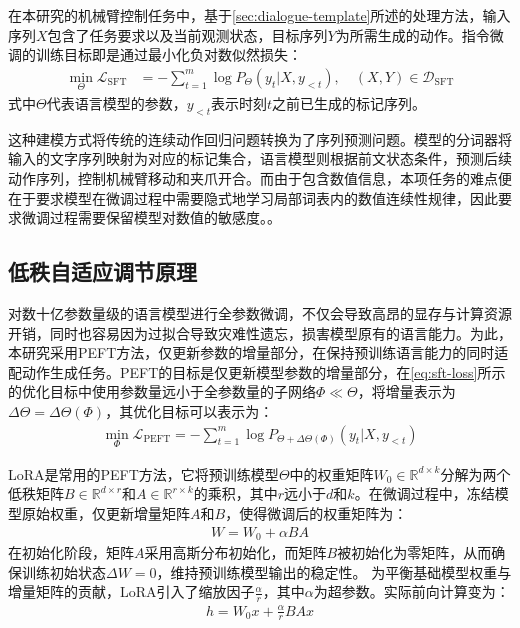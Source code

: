 在本研究的机械臂控制任务中，基于\cref{sec:dialogue-template}所述的处理方法，输入序列$X$包含了任务要求以及当前观测状态，目标序列$Y$为所需生成的动作。指令微调的训练目标即是通过最小化负对数似然损失：
\begin{align}\label{eq:sft-loss}
  \min_{\Theta}\mathcal{L}_{\text{SFT}} &= -\sum_{t=1}^{m} \log P_{\Theta}(y_t | X, y_{<t}), \quad (X,Y) \in \mathcal{D}_{\text{SFT}}
\end{align}
式中$\Theta$代表语言模型的参数，$y_{<t}$表示时刻$t$之前已生成的标记序列。

这种建模方式将传统的连续动作回归问题转换为了序列预测问题。模型的分词器将输入的文字序列映射为对应的标记集合，语言模型则根据前文状态条件，预测后续动作序列，控制机械臂移动和夹爪开合。而由于包含数值信息，本项任务的难点便在于要求模型在微调过程中需要隐式地学习局部词表内的数值连续性规律，因此要求微调过程需要保留模型对数值的敏感度。。

\subsection{低秩自适应调节原理}
对数十亿参数量级的语言模型进行全参数微调，不仅会导致高昂的显存与计算资源开销，同时也容易因为过拟合导致灾难性遗忘，损害模型原有的语言能力。为此，本研究采用PEFT方法，仅更新参数的增量部分，在保持预训练语言能力的同时适配动作生成任务。PEFT的目标是仅更新模型参数的增量部分，在\eqref{eq:sft-loss}所示的优化目标中使用参数量远小于全参数量的子网络$\Phi \ll \Theta$，将增量表示为$\Delta \Theta = \Delta \Theta (\Phi)$，其优化目标可以表示为：
\begin{align}\label{eq:peft-loss}
  \min_{\Phi} \mathcal{L}_{\text{PEFT}} = -\sum_{t=1}^{m} \log P_{\Theta + \Delta \Theta(\Phi)}(y_t | X, y_{<t})
\end{align}

LoRA是常用的PEFT方法，它将预训练模型$\Theta$中的权重矩阵$W_0 \in \mathbb{R}^{d \times k}$分解为两个低秩矩阵$B \in \mathbb{R}^{d \times r}$和$A \in \mathbb{R}^{r \times k}$的乘积，其中$r$远小于$d$和$k$。在微调过程中，冻结模型原始权重，仅更新增量矩阵$A$和$B$，使得微调后的权重矩阵为：
\begin{align}
  W = W_0 + \alpha BA
\end{align}
在初始化阶段，矩阵$A$采用高斯分布初始化，而矩阵$B$被初始化为零矩阵，从而确保训练初始状态$\Delta W = 0$，维持预训练模型输出的稳定性。
为平衡基础模型权重与增量矩阵的贡献，LoRA引入了缩放因子$\frac{\alpha}{r}$，其中$\alpha$为超参数。实际前向计算变为：
\begin{align}
  h = W_0x+\frac{\alpha}{r}BAx
\end{align}

